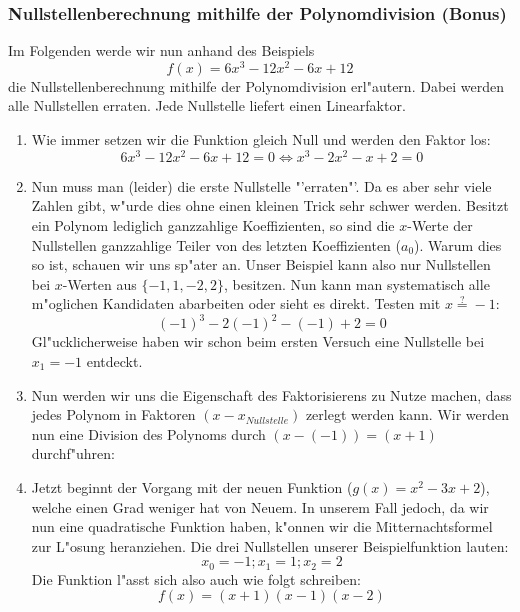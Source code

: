 \subsubsection{Nullstellenberechnung mithilfe der Polynomdivision (Bonus)}
Im Folgenden werde wir nun anhand des Beispiels 
\begin{equation*}
f(x) = 6x^3 - 12x^2 - 6x + 12
\end{equation*}
die Nullstellenberechnung mithilfe der Polynomdivision erl"autern. Dabei werden alle Nullstellen erraten. Jede Nullstelle liefert einen Linearfaktor. 
\begin{enumerate}
\item Wie immer setzen wir die Funktion gleich Null und werden den Faktor los:
\begin{equation*}
6x^3 - 12x^2 - 6x + 12 = 0 \iff x^3 -2x^2 - x + 2 = 0
\end{equation*}

\item Nun muss man (leider) die erste Nullstelle "'erraten"'. Da es aber sehr viele Zahlen gibt, w"urde dies ohne einen kleinen Trick sehr schwer werden. Besitzt ein Polynom lediglich ganzzahlige Koeffizienten, so sind die $x$-Werte der Nullstellen ganzzahlige Teiler von des letzten Koeffizienten ($a_0$). Warum dies so ist, schauen wir uns sp"ater an. Unser Beispiel kann also nur Nullstellen bei $x$-Werten aus $\{-1, 1, -2, 2\}$, besitzen. Nun kann man systematisch alle m"oglichen Kandidaten abarbeiten oder sieht es direkt. Testen mit $x \stackrel{?}{=} -1$:
\begin{equation*}
(-1)^3 - 2(-1)^2 - (-1) + 2 = 0
\end{equation*}
Gl"ucklicherweise haben wir schon beim ersten Versuch eine Nullstelle bei $x_1 = -1$ entdeckt.
\item Nun werden wir uns die Eigenschaft des Faktorisierens zu Nutze machen, dass jedes Polynom in Faktoren $(x-x_{Nullstelle})$ zerlegt werden kann. Wir werden nun eine Division des Polynoms durch $(x-(-1)) = (x + 1)$ durchf"uhren:

\item Jetzt beginnt der Vorgang mit der neuen Funktion ($g(x) = x^2 - 3x + 2$), welche einen Grad weniger hat von Neuem. In unserem Fall jedoch, da wir nun eine quadratische Funktion haben, k"onnen wir die Mitternachtsformel zur L"osung heranziehen. Die drei Nullstellen unserer Beispielfunktion lauten:
\begin{equation*}
x_0 = -1; x_1 = 1; x_2 = 2
\end{equation*}
Die Funktion l"asst sich also auch wie folgt schreiben:
\begin{equation*}
f(x)=(x+1)(x-1)(x-2)
\end{equation*}
\end{enumerate}
